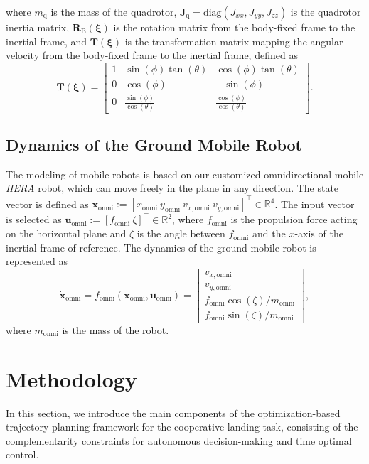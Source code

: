 \documentclass[conference,preprint]{IEEEtran}
\begin{document}
where $m_\text{q}$ is the mass of the quadrotor, $\bm{J}_\text{q}=\text{diag}(J_{xx},J_{yy},J_{zz})$ is the quadrotor inertia matrix, $\bm{R}_\text{B}(\bm{\xi})$ is the rotation matrix from the body-fixed frame to the inertial frame, and $\bm{T}(\bm{\xi})$ is the transformation matrix mapping the angular velocity from the body-fixed frame to the inertial frame, defined as
\begin{equation*}
  \bm{T}(\bm{\xi}) = \left[\begin{array}{ccc}
      1 & \sin(\phi)\tan(\theta) & \cos(\phi)\tan(\theta) \\
      0 & \cos(\phi)             & -\sin(\phi)            \\
      0 & \frac{\sin(\phi)}{\cos(\theta)} & \frac{\cos(\phi)}{\cos(\theta)}
    \end{array}\right].
\end{equation*}

\subsection{Dynamics of the Ground Mobile Robot}

The modeling of mobile robots is based on our customized omnidirectional mobile \textit{HERA} robot, which can move freely in the plane in any direction. The state vector is defined as $\bm{x}_{\text{omni}} := [x_\text{omni}\ y_\text{omni}\ v_{x, \text{omni}}\ v_{y, \text{omni}}]^\top \in \mathbb{R}^{4}$.
The input vector is selected as $\bm{u}_\text{omni} := \left[f_\text{omni}\  \zeta\right]^\top \in \mathbb{R}^{2}$, where $f_\text{omni}$ is the propulsion force acting on the horizontal plane and $\zeta$ is the angle between $f_\text{omni}$ and the $x$-axis of the inertial frame of reference.
The dynamics of the ground mobile robot is represented as
\begin{equation}
  \label{eq:omni_dynamics}
      \dot{\bm{x}}_{\text{omni}}= f_\text{omni}(\bm{x}_{\text{omni}}, \bm{u}_{\text{omni}}) =
      \begin{bmatrix}
      v_{x, \text{omni}}\\
      v_{y, \text{omni}}\\
      f_\text{omni}\cos{(\zeta)}/m_{\text{omni}}\\
      f_\text{omni}\sin{(\zeta)}/m_{\text{omni}}
  \end{bmatrix},
  \end{equation}
  where $m_{\text{omni}}$ is the mass of the robot.

\section{Methodology}
\label{sec:methodology}
In this section, we introduce the main components of the optimization-based trajectory planning framework for the cooperative landing task, consisting of the complementarity constraints for autonomous decision-making and time optimal control. 
\end{document}
